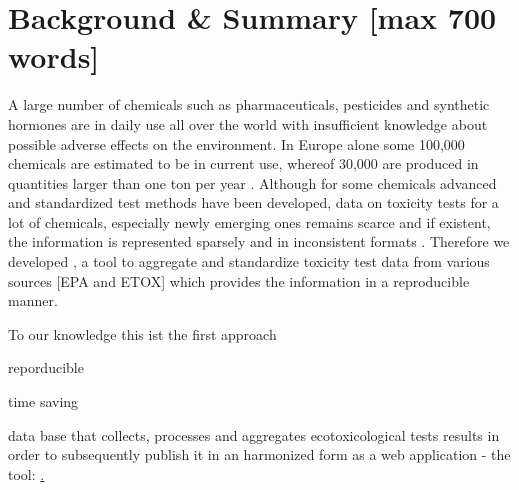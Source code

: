 
\section*{Background \& Summary [max 700 words]}

A large number of chemicals such as pharmaceuticals, pesticides and synthetic hormones are in daily use all over the world with insufficient knowledge about possible adverse effects on the environment. In Europe alone some 100,000 chemicals are estimated to be in current use, whereof 30,000 are produced in quantities larger than one ton per year \citep{breithaupt_costs_2006}. Although for some chemicals advanced and standardized test methods \citep{oecd_oecd_2018} have been developed, data on toxicity tests for a lot of chemicals, especially newly emerging ones remains scarce and if existent, the information is represented sparsely and in inconsistent formats \citep{gessner_fostering_2016}. Therefore we developed \standardtox{}, a tool to aggregate and standardize toxicity test data from various sources [EPA and ETOX] which provides the information in a reproducible manner.



To our knowledge this ist the first approach

reporducible

time saving





data base that collects, processes and aggregates ecotoxicological tests results in order to subsequently publish it in an harmonized form as a web application - the \etoxbase{} tool: \href{http://139.14.20.252:3838/etox-base-shiny/}. 





